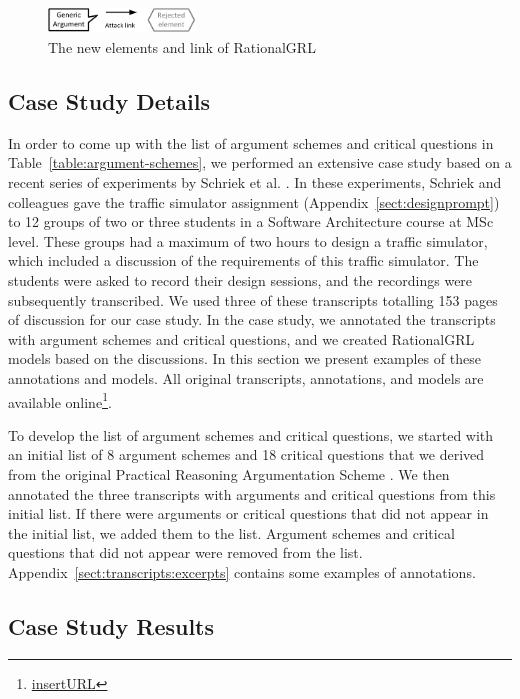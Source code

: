 \begin{figure}[h]
\centering
\includegraphics[width=0.35\textwidth]{img/legend}
\caption{The new elements and link of RationalGRL}
\label{fig:rationalgrllegend}
\end{figure}

\subsection{Case Study Details}

In order to come up with the list of argument schemes and critical questions in Table~\ref{table:argument-schemes}, we performed an extensive case study based on a recent series of experiments by Schriek et al. \cite{SchriekEtal2016}. In these experiments, Schriek and colleagues gave the traffic simulator assignment (Appendix~\ref{sect:designprompt}) to 12 groups of two or three students in a Software Architecture course at MSc level. These groups had a maximum of two hours to design a traffic simulator, which included a discussion of the requirements of this traffic simulator. The students were asked to record their design sessions, and the recordings were subsequently transcribed. We used three of these transcripts totalling 153 pages of discussion for our case study. In the case study, we annotated the transcripts with argument schemes and critical questions, and we created RationalGRL models based on the discussions. In this section we present examples of these annotations and models. All original transcripts, annotations, and models are available online\footnote{\url{insertURL}}.

To develop the list of argument schemes and critical questions, we started with an initial list of 8 argument schemes and 18 critical questions that we derived from the original Practical Reasoning Argumentation Scheme \cite{atkinson2007}. We then annotated the three transcripts with arguments and critical questions from this initial list. If there were arguments or critical questions that did not appear in the initial list, we added them to the list. Argument schemes and critical questions that did not appear were removed from the list. Appendix~\ref{sect:transcripts:excerpts} contains some examples of annotations.

\subsection{Case Study Results}

